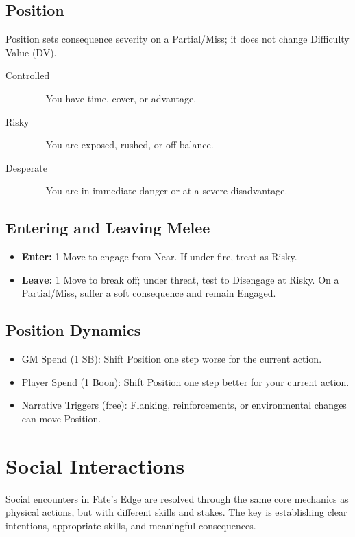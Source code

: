 \subsection*{Position}

Position sets consequence severity on a Partial/Miss; it does not change Difficulty Value (DV).
\begin{description}
  \item[Controlled]  — You have time, cover, or advantage.
  \item[Risky]  — You are exposed, rushed, or off-balance.
  \item[Desperate]  — You are in immediate danger or at a severe disadvantage.
\end{description}

\subsection*{Entering and Leaving Melee}
\begin{itemize}
  \item \textbf{Enter:} 1 Move to engage from Near. If under fire, treat as Risky.
  \item \textbf{Leave:} 1 Move to break off; under threat, test to Disengage at Risky. On a Partial/Miss, suffer a soft consequence and remain Engaged.
\end{itemize}

\subsection*{Position Dynamics}
\begin{itemize}
  \item GM Spend (1 SB): Shift Position one step worse for the current action.
  \item Player Spend (1 Boon): Shift Position one step better for your current action.
  \item Narrative Triggers (free): Flanking, reinforcements, or environmental changes can move Position.
\end{itemize}

\section{Social Interactions}

Social encounters in Fate's Edge are resolved through the same core mechanics as physical actions, but with different skills and stakes. The key is establishing clear intentions, appropriate skills, and meaningful consequences.

